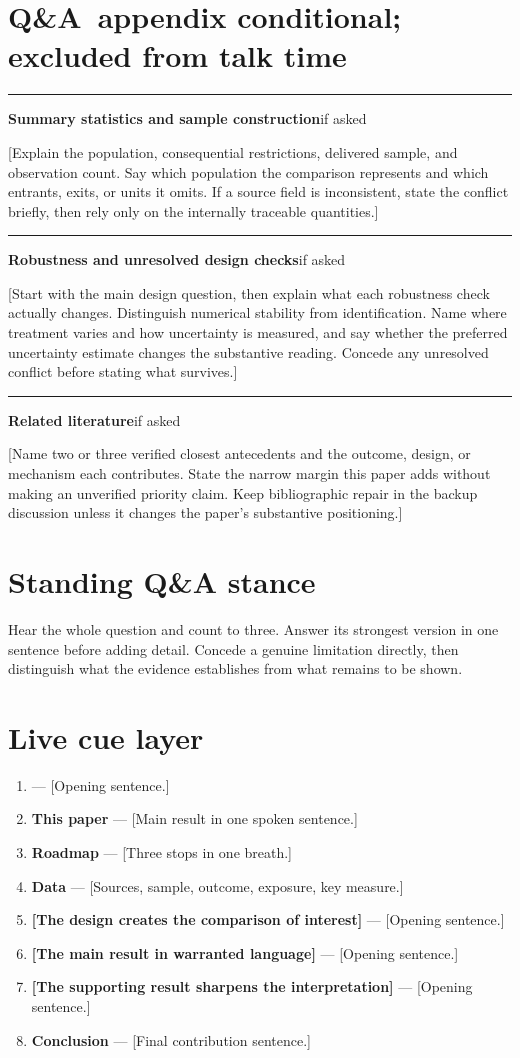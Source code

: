 \documentclass[11pt]{article}
\newcommand{\scriptframe}[3]{%
  \Needspace{9\baselineskip}%
  \par\medskip\noindent\textcolor{ScriptBlue}{\rule{\linewidth}{0.55pt}}%
  \par\smallskip\noindent
  \textbf{#1}\hfill\textcolor{ScriptGray}{\small #2}\par\smallskip
  #3\par}
\newcommand{\ScriptAppendix}{%
  \clearpage
  \section*{\mbox{Q\&A appendix} \hfill
    \normalfont\small\textcolor{ScriptGray}{conditional; excluded from talk time}}}
\begin{document}
\ScriptAppendix

\scriptframe{Summary statistics and sample construction}{if asked}{%
  [Explain the population, consequential restrictions, delivered sample, and
  observation count. Say which population the comparison represents and which
  entrants, exits, or units it omits. If a source field is inconsistent, state
  the conflict briefly, then rely only on the internally traceable quantities.]
}

\scriptframe{Robustness and unresolved design checks}{if asked}{%
  [Start with the main design question, then explain what each robustness check
  actually changes. Distinguish numerical stability from identification. Name
  where treatment varies and how uncertainty is measured, and say whether the
  preferred uncertainty estimate changes the substantive reading. Concede any unresolved
  conflict before stating what survives.]
}

\scriptframe{Related literature}{if asked}{%
  [Name two or three verified closest antecedents and the outcome, design, or
  mechanism each contributes. State the narrow margin this paper adds without
  making an unverified priority claim. Keep bibliographic repair in the backup
  discussion unless it changes the paper's substantive positioning.]
}

\section*{Standing Q\&A stance}
Hear the whole question and count to three. Answer its strongest version in
one sentence before adding detail. Concede a genuine limitation directly,
then distinguish what the evidence establishes from what remains to be shown.

\section*{Live cue layer}
\raggedright\small
\begin{enumerate}\setlength{\itemsep}{0.45em}
  \item \textbf{\KeyQuestion} --- [Opening sentence.]
  \item \textbf{This paper} --- [Main result in one spoken sentence.]
  \item \textbf{Roadmap} --- [Three stops in one breath.]
  \item \textbf{Data} --- [Sources, sample, outcome, exposure, key measure.]
  \item \textbf{[The design creates the comparison of interest]} --- [Opening sentence.]
  \item \textbf{[The main result in warranted language]} --- [Opening sentence.]
  \item \textbf{[The supporting result sharpens the interpretation]} --- [Opening sentence.]
  \item \textbf{Conclusion} --- [Final contribution sentence.]
\end{enumerate}
\end{document}
